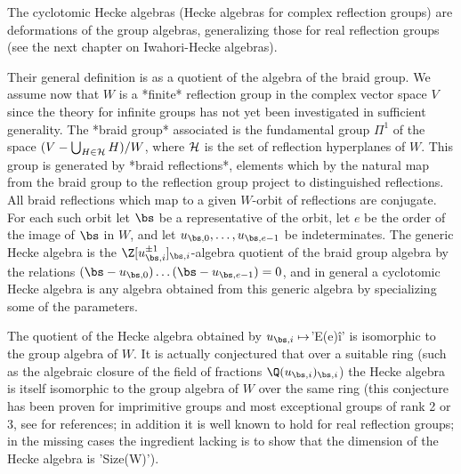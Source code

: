 
The  cyclotomic  Hecke  algebras  (Hecke  algebras  for  complex reflection
groups) are deformations of the group algebras, generalizing those for real
reflection groups (see the next chapter on Iwahori-Hecke algebras).

Their  general definition  is as  a quotient  of the  algebra of  the braid
group. We assume now that $W$ is a *finite* reflection group in the complex
vector  space $V$  since the  theory for  infinite groups  has not yet been
investigated  in sufficient generality. The *braid group* associated is the
fundamental  group $\Pi^1$  of the  space $(V-\bigcup_{H\in{\cal H}} H)/W$,
where ${\cal H}$ is the set of reflection hyperplanes of $W$. This group is
generated  by *braid reflections*,  elements which by  the natural map from
the   braid  group  to  the   reflection  group  project  to  distinguished
reflections.  All  braid  reflections  which  map  to  a given $W$-orbit of
reflections   are  conjugate.   For  each   such  orbit   let  $\bs$  be  a
representative  of the orbit, let $e$ be the order of the image of $\bs$ in
$W$,  and let $u_{\bs,0},\ldots,u_{\bs,e-1}$ be indeterminates. The generic
Hecke  algebra is  the $\Z[u_{\bs,i}^{\pm  1}]_{\bs,i}$-algebra quotient of
the braid group algebra by the relations
$(\bs-u_{\bs,0})\ldots(\bs-u_{\bs,e-1})=0$,  and  in  general  a cyclotomic
Hecke  algebra  is  any  algebra  obtained  from  this  generic  algebra by
specializing some of the parameters.

The  quotient of the Hecke  algebra obtained by $u_{\bs,i}\mapsto$'E(e)\^i'
is  isomorphic to the group algebra of $W$. It is actually conjectured that
over  a  suitable  ring  (such  as  the  algebraic  closure of the field of
fractions  $\Q(u_{\bs,i})_{\bs,i }$) the Hecke algebra is itself isomorphic
to  the group algebra of  $W$ over the same  ring (this conjecture has been
proven  for imprimitive groups and most exceptional  groups of rank 2 or 3,
see  \cite{MM10} for references; in  addition it is well  known to hold for
real  reflection groups; in the missing  cases the ingredient lacking is to
show that the dimension of the Hecke algebra is 'Size(W)').

